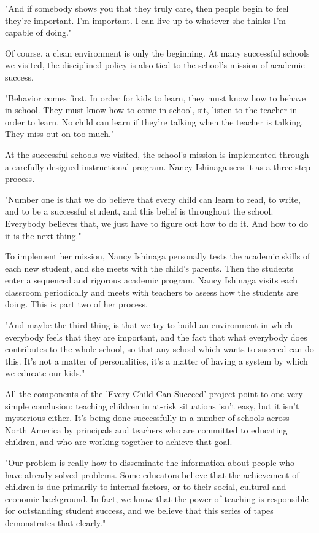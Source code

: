 "And if somebody shows you that they truly care, then people begin to feel they're important.
I'm important.
I can live up to whatever she thinks I'm capable of doing."

Of course, a clean environment is only the beginning.
At many successful schools we visited, the disciplined policy is also tied to the school's mission of academic success.

"Behavior comes first.
In order for kids to learn, they must know how to behave in school.
They must know how to come in school, sit, listen to the teacher in order to learn.
No child can learn if they're talking when the teacher is talking.
They miss out on too much."

At the successful schools we visited, the school's mission is implemented through a carefully designed instructional program.
Nancy Ishinaga sees it as a three-step process.

"Number one is that we do believe that every child can learn to read, to write, and to be a successful student, and this belief is throughout the school.
Everybody believes that, we just have to figure out how to do it.
And how to do it is the next thing."

To implement her mission, Nancy Ishinaga personally tests the academic skills of each new student, and she meets with the child's parents.
Then the students enter a sequenced and rigorous academic program.
Nancy Ishinaga visits each classroom periodically and meets with teachers to assess how the students are doing.
This is part two of her process.

"And maybe the third thing is that we try to build an environment in which everybody feels that they are important, and the fact that what everybody does contributes to the whole school, so that any school which wants to succeed can do this.
It's not a matter of personalities, it's a matter of having a system by which we educate our kids."

All the components of the 'Every Child Can Succeed' project point to one very simple conclusion: teaching children in at-risk situations isn't easy, but it isn't mysterious either.
It's being done successfully in a number of schools across North America by principals and teachers who are committed to educating children, and who are working together to achieve that goal.

"Our problem is really how to disseminate the information about people who have already solved problems.
Some educators believe that the achievement of children is due primarily to internal factors, or to their social, cultural and economic background.
In fact, we know that the power of teaching is responsible for outstanding student success, and we believe that this series of tapes demonstrates that clearly."


